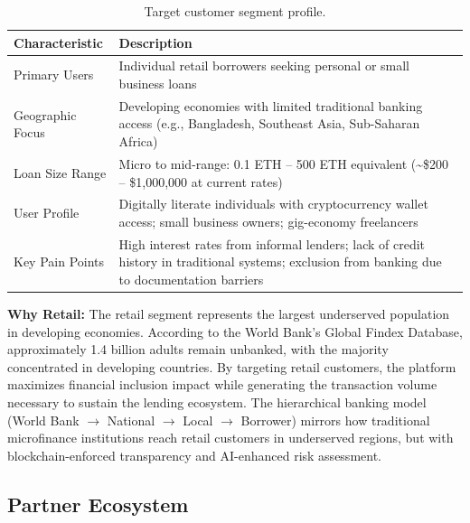 \documentclass[12pt,a4paper]{report}
\newcommand{\tableheadfont}{\bfseries\small\color{PrimaryBlue}}
\newenvironment{moderntable}[1][H]{%
    \begin{table}[#1]\centering\small%
    \renewcommand{\arraystretch}{1.35}%
}{%
    \end{table}%
}
\begin{document}
\begin{moderntable}
\caption{Target customer segment profile.}
\begin{tabular}{@{} >{\raggedright}p{3.8cm} >{\raggedright\arraybackslash}p{8.2cm} @{}}
\toprule
\tableheadfont Characteristic & \tableheadfont Description \\
\midrule
\rowcolor{RowShade}
Primary Users & Individual retail borrowers seeking personal or small business loans \\
Geographic Focus & Developing economies with limited traditional banking access (e.g., Bangladesh, Southeast Asia, Sub-Saharan Africa) \\
\rowcolor{RowShade}
Loan Size Range & Micro to mid-range: 0.1 ETH -- 500 ETH equivalent (\textasciitilde\$200 -- \$1,000,000 at current rates) \\
User Profile & Digitally literate individuals with cryptocurrency wallet access; small business owners; gig-economy freelancers \\
\rowcolor{RowShade}
Key Pain Points & High interest rates from informal lenders; lack of credit history in traditional systems; exclusion from banking due to documentation barriers \\
\bottomrule
\end{tabular}
\end{moderntable}

\textbf{Why Retail:} The retail segment represents the largest underserved population in developing economies. According to the World Bank's Global Findex Database, approximately 1.4 billion adults remain unbanked, with the majority concentrated in developing countries. By targeting retail customers, the platform maximizes financial inclusion impact while generating the transaction volume necessary to sustain the lending ecosystem. The hierarchical banking model (World Bank $\to$ National $\to$ Local $\to$ Borrower) mirrors how traditional microfinance institutions reach retail customers in underserved regions, but with blockchain-enforced transparency and AI-enhanced risk assessment.

\subsection{Partner Ecosystem}
\end{document}
